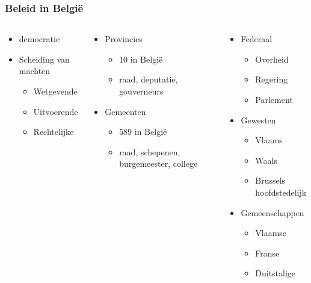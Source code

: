 \documentclass{beamer}
\begin{document}
\begin{frame}
\frametitle{Beleid in Belgi\"{e}}
\begin{columns}
\begin{block}{}
\begin{itemize}
\item democratie
\item Scheiding van machten
\begin{itemize}
\item Wetgevende
\item Uitvoerende
\item Rechtelijke
\end{itemize}
\end{itemize}
\end{block}
\begin{block}{}
\begin{itemize}
\item Provincies
\begin{itemize}
\item 10 in Belgi\"{e}
\item raad, deputatie, gouverneurs
\end{itemize}
\item Gemeenten
\begin{itemize}
\item 589 in Belgi\"{e}
\item raad, schepenen, burgemeester, college
\end{itemize}
\end{itemize}
\end{block}
\begin{block}{}
\begin{itemize}
\item Federaal
	\begin{itemize}
	\item Overheid
	\item Regering
	\item Parlement
	\end{itemize}
\item Gewesten
	\begin{itemize}
	\item Vlaams
	\item Waals
	\item Brussels hoofdstedelijk
	\end{itemize}
\item Gemeenschappen
	\begin{itemize}
	\item Vlaamse
	\item Franse
	\item Duitstalige
	\end{itemize}
\end{itemize}
\end{block}
\end{columns}
\end{frame}
\end{document}
